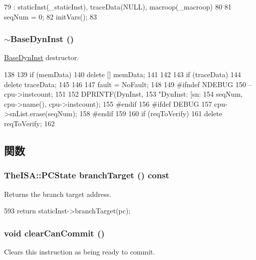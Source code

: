 \begin{DoxyCode}
79     : staticInst(_staticInst), traceData(NULL), macroop(_macroop)
80 {
81     seqNum = 0;
82     initVars();
83 }
\end{DoxyCode}
\hypertarget{classBaseDynInst_af446a3befb983b87ef04566ad283c371}{
\subsubsection[{$\sim$BaseDynInst}]{\setlength{\rightskip}{0pt plus 5cm}$\sim${\bf BaseDynInst} ()}}
\label{classBaseDynInst_af446a3befb983b87ef04566ad283c371}
\hyperlink{classBaseDynInst}{BaseDynInst} destructor. 


\begin{DoxyCode}
138 {
139     if (memData) {
140         delete [] memData;
141     }
142 
143     if (traceData) {
144         delete traceData;
145     }
146 
147     fault = NoFault;
148 
149 #ifndef NDEBUG
150     --cpu->instcount;
151 
152     DPRINTF(DynInst,
153         "DynInst: [sn:%
154         seqNum, cpu->name(), cpu->instcount);
155 #endif
156 #ifdef DEBUG
157     cpu->snList.erase(seqNum);
158 #endif
159 
160     if (reqToVerify)
161         delete reqToVerify;
162 }
\end{DoxyCode}


\subsection{関数}
\hypertarget{classBaseDynInst_a066dfcf24b065ae319cc2d27aa4eb09c}{
\subsubsection[{branchTarget}]{\setlength{\rightskip}{0pt plus 5cm}TheISA::PCState branchTarget () const}}
\label{classBaseDynInst_a066dfcf24b065ae319cc2d27aa4eb09c}
Returns the branch target address. 


\begin{DoxyCode}
593     { return staticInst->branchTarget(pc); }
\end{DoxyCode}
\hypertarget{classBaseDynInst_ad22bc2d91297685b76dc15215666883d}{
\subsubsection[{clearCanCommit}]{\setlength{\rightskip}{0pt plus 5cm}void clearCanCommit ()}}
\label{classBaseDynInst_ad22bc2d91297685b76dc15215666883d}
Clears this instruction as being ready to commit. 


